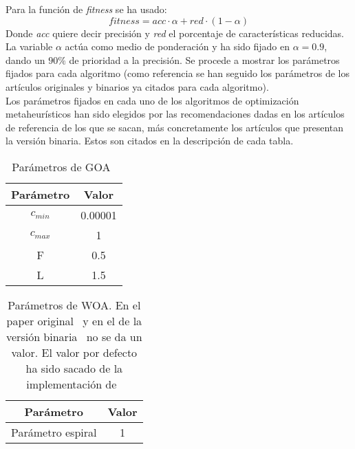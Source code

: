 Para la función de \textit{fitness} se ha usado:
\begin{equation}
    fitness = acc\cdot\alpha + red\cdot(1-\alpha)
    \label{eq:fitness}
\end{equation}
Donde \textit{acc} quiere decir precisión y \textit{red} el porcentaje de características reducidas. La variable $\alpha$ actúa como medio de ponderación y ha sido fijado en $\alpha=0.9$, dando un $90\%$ de prioridad a la precisión.
Se procede a mostrar los parámetros fijados para cada algoritmo (como referencia se han seguido los parámetros de los artículos originales y binarios ya citados para cada algoritmo).\\[6pt]
Los parámetros fijados en cada uno de los algoritmos de optimización metaheurísticos han sido elegidos por las recomendaciones dadas en los artículos de referencia de los que se sacan, más concretamente los artículos que presentan la versión binaria. Estos son citados en la descripción de cada tabla.

\begin{table}[H]
    \centering
    \begin{tabular}{ c c }
        \hline
        \textbf{Parámetro} & \textbf{Valor} \\
        \hline
        $c_{min}$          & 0.00001        \\
        $c_{max}$          & 1              \\
        F                  & 0.5            \\
        L                  & 1.5            \\
        \hline
    \end{tabular}
    \caption{Parámetros de GOA~\cite{mafarja_binary_2019}}
\end{table}

\begin{table}[H]
    \centering
    \begin{tabular}{ c c }
        \hline
        \textbf{Parámetro} & \textbf{Valor} \\
        \hline
        Parámetro espiral  & 1              \\
        \hline
    \end{tabular}
    \caption{Parámetros de WOA. En el paper original~\cite{mirjalili_whale_2016} y en el de la versión binaria~\cite{mafarja_whale_2018} no se da un valor. El valor por defecto ha sido sacado de la implementación de~\cite{Li2019AnAW}}
\end{table}

